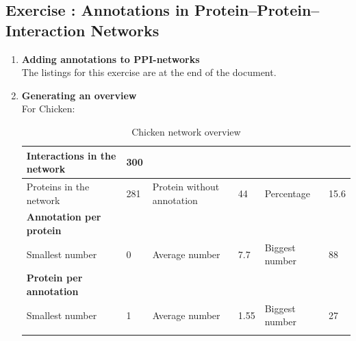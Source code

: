 \documentclass[10pt,a4paper]{article}
\newcommand{\exercise}[1]
{
  \stepcounter{subsection}
  \subsection*{Exercise \thesubsection: #1}

}
\begin{document}
\newpage
\exercise{Annotations in Protein–Protein–Interaction Networks}
\begin{enumerate}
	
	\item \textbf{Adding annotations to PPI-networks}\\
	
		The listings for this exercise are at the end of the document.


	\item \textbf{Generating an overview}\\
	
	
	
	
	
	
	For Chicken: 
	
	\begin{table}[H]
		\centering
		\caption{Chicken network overview}
		\vspace*{1mm}
		\label{chickentableoverview}
		\begin{tabular}{llllll}
			\hline
			\multicolumn{1}{|l|}{Interactions in the network}     & \multicolumn{1}{l|}{300} & \multicolumn{1}{l|}{}                           & \multicolumn{1}{l|}{}    & \multicolumn{1}{l|}{}               & \multicolumn{1}{l|}{}     \\ \hline
			\multicolumn{1}{|l|}{Proteins in the network}         & \multicolumn{1}{l|}{281} & \multicolumn{1}{l|}{Protein without annotation} & \multicolumn{1}{l|}{44}  & \multicolumn{1}{l|}{Percentage}     & \multicolumn{1}{l|}{15.6} \\ \hline
			\multicolumn{1}{|l|}{\textbf{Annotation per protein}} & \multicolumn{1}{l|}{}    & \multicolumn{1}{l|}{}                           & \multicolumn{1}{l|}{}    & \multicolumn{1}{l|}{}               & \multicolumn{1}{l|}{}     \\ \hline
			\multicolumn{1}{|l|}{Smallest number}                 & \multicolumn{1}{l|}{0}   & \multicolumn{1}{l|}{Average number}             & \multicolumn{1}{l|}{7.7} & \multicolumn{1}{l|}{Biggest number} & \multicolumn{1}{l|}{88}   \\ \hline
			\multicolumn{1}{|l|}{\textbf{Protein per annotation}} & \multicolumn{1}{l|}{}    & \multicolumn{1}{l|}{}                           & \multicolumn{1}{l|}{}    & \multicolumn{1}{l|}{}               & \multicolumn{1}{l|}{}     \\ \hline
			\multicolumn{1}{|l|}{Smallest number}                 & \multicolumn{1}{l|}{1}   & \multicolumn{1}{l|}{Average number}             & \multicolumn{1}{l|}{1.55} & \multicolumn{1}{l|}{Biggest number} & \multicolumn{1}{l|}{27}  \\ \hline
			&                          &                                                 &                          &                                     &                          
		\end{tabular}
	\end{table}


\end{enumerate}
\end{document}
